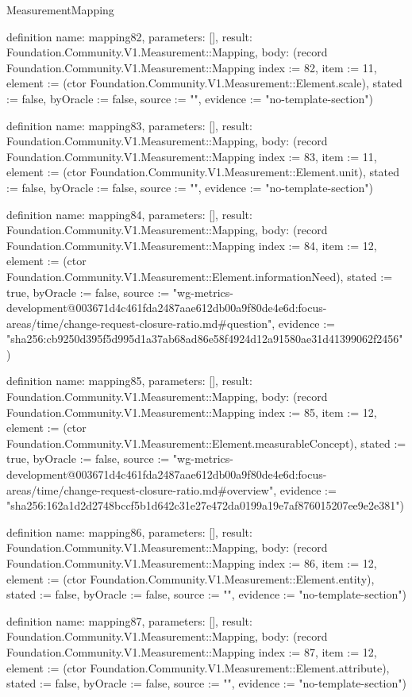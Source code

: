 \begin{lexlean}{MeasurementMapping}
\begin{semanticmodule}
definition{
  name: mapping82,
  parameters: [],
  result: Foundation.Community.V1.Measurement::Mapping,
  body: (record Foundation.Community.V1.Measurement::Mapping {index := 82, item := 11, element := (ctor Foundation.Community.V1.Measurement::Element.scale), stated := false, byOracle := false, source := "", evidence := "no-template-section"})
}

definition{
  name: mapping83,
  parameters: [],
  result: Foundation.Community.V1.Measurement::Mapping,
  body: (record Foundation.Community.V1.Measurement::Mapping {index := 83, item := 11, element := (ctor Foundation.Community.V1.Measurement::Element.unit), stated := false, byOracle := false, source := "", evidence := "no-template-section"})
}

definition{
  name: mapping84,
  parameters: [],
  result: Foundation.Community.V1.Measurement::Mapping,
  body: (record Foundation.Community.V1.Measurement::Mapping {index := 84, item := 12, element := (ctor Foundation.Community.V1.Measurement::Element.informationNeed), stated := true, byOracle := false, source := "wg-metrics-development@003671d4c461fda2487aae612db00a9f80de4e6d:focus-areas/time/change-request-closure-ratio.md#question", evidence := "sha256:cb9250d395f5d995d1a37ab68ad86e58f4924d12a91580ae31d41399062f2456"})
}

definition{
  name: mapping85,
  parameters: [],
  result: Foundation.Community.V1.Measurement::Mapping,
  body: (record Foundation.Community.V1.Measurement::Mapping {index := 85, item := 12, element := (ctor Foundation.Community.V1.Measurement::Element.measurableConcept), stated := true, byOracle := false, source := "wg-metrics-development@003671d4c461fda2487aae612db00a9f80de4e6d:focus-areas/time/change-request-closure-ratio.md#overview", evidence := "sha256:162a1d2d2748bccf5b1d642c31e27e472da0199a19e7af876015207ee9e2e381"})
}

definition{
  name: mapping86,
  parameters: [],
  result: Foundation.Community.V1.Measurement::Mapping,
  body: (record Foundation.Community.V1.Measurement::Mapping {index := 86, item := 12, element := (ctor Foundation.Community.V1.Measurement::Element.entity), stated := false, byOracle := false, source := "", evidence := "no-template-section"})
}

definition{
  name: mapping87,
  parameters: [],
  result: Foundation.Community.V1.Measurement::Mapping,
  body: (record Foundation.Community.V1.Measurement::Mapping {index := 87, item := 12, element := (ctor Foundation.Community.V1.Measurement::Element.attribute), stated := false, byOracle := false, source := "", evidence := "no-template-section"})
}


\end{semanticmodule}
\end{lexlean}
